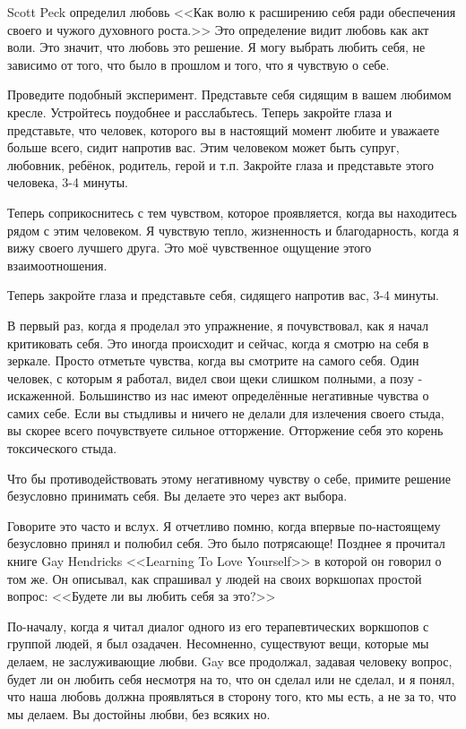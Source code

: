 \documentclass[10pt, fleqn]{article}
\begin{document}
Scott Peck определил любовь <<Как волю к расширению себя ради обеспечения своего и чужого духовного роста.>> Это определение видит любовь как акт воли. Это значит, что любовь это решение. Я могу выбрать любить себя, не зависимо от того, что было в прошлом и того, что я чувствую о себе.


Проведите подобный эксперимент. Представьте себя сидящим в вашем любимом кресле. Устройтесь поудобнее и расслабьтесь. Теперь закройте глаза и представьте, что человек, которого вы в настоящий момент любите и уважаете больше всего, сидит напротив вас. Этим человеком может быть супруг, любовник, ребёнок, родитель, герой и т.п. Закройте глаза и представьте этого человека, 3-4 минуты.

Теперь соприкоснитесь с тем чувством, которое проявляется, когда вы находитесь рядом с этим человеком. Я чувствую тепло, жизненность и благодарность, когда я вижу своего лучшего друга. Это моё чувственное ощущение этого взаимоотношения.

Теперь закройте глаза и представьте себя, сидящего напротив вас, 3-4 минуты.

В первый раз, когда я проделал это упражнение, я почувствовал, как я начал критиковать себя. Это иногда происходит и сейчас, когда я смотрю на себя в зеркале. Просто отметьте чувства, когда вы смотрите на самого себя. Один человек, с которым я работал, видел свои щеки слишком полными, а позу - искаженной. Большинство из нас имеют определённые негативные чувства о самих себе. Если вы стыдливы и ничего не делали для излечения своего стыда, вы скорее всего почувствуете сильное отторжение. Отторжение себя это корень токсического стыда.




Что бы противодействовать этому негативному чувству о себе, примите решение безусловно принимать себя. Вы делаете это через акт выбора.


Говорите это часто и вслух.
Я отчетливо помню, когда впервые по-настоящему безусловно принял и полюбил себя. Это было потрясающе! Позднее я прочитал книге Gay Hendricks <<Learning To Love Yourself>> в которой он говорил о том же. Он описывал, как спрашивал у людей на своих воркшопах простой вопрос: <<Будете ли вы любить себя за это?>>

По-началу, когда я читал диалог одного из его терапевтических воркшопов с группой людей, я был озадачен. Несомненно, существуют вещи, которые мы делаем, не заслуживающие любви. Gay все продолжал, задавая человеку вопрос, будет ли он любить себя несмотря на то, что он сделал или не сделал, и я понял, что наша любовь должна проявляться в сторону того, кто мы есть, а не за то, что мы делаем. Вы достойны любви, без всяких но.
\end{document}
